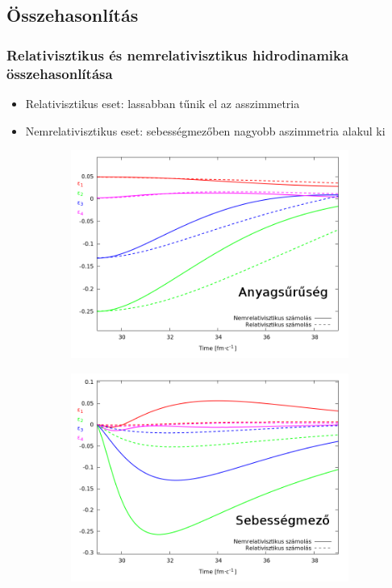 \documentclass{beamer}
\begin{document}
\subsection{Összehasonlítás}
\begin{frame}[noframenumbering]
\frametitle{Relativisztikus és nemrelativisztikus hidrodinamika összehasonlítása}
\begin{center}
\begin{itemize}
\setlength{\itemsep}{12pt}
\item<1-> Relativisztikus eset: lassabban tűnik el az asszimmetria
\item<1-> Nemrelativisztikus eset: sebességmezőben nagyobb aszimmetria alakul ki

\end{itemize}
\begin{figure}[H]
	\centering
    \begin{subfigure}[b]{0.49\textwidth}
    		\includegraphics[width=\textwidth]{pic/res/relnonrel_n}
	\end{subfigure}
	\begin{subfigure}[b]{0.49\textwidth}
        	\includegraphics[width=\textwidth]{pic/res/relnonrel_v}
	\end{subfigure}
\end{figure}
\end{center}
\end{frame}
\end{document}
